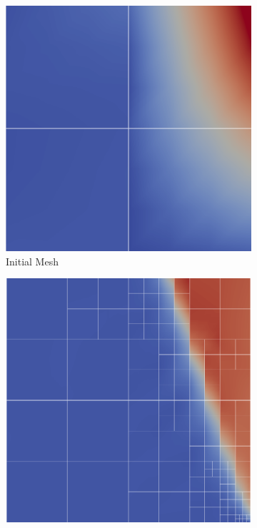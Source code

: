 \documentclass[Dissertation.tex]{subfiles}
\begin{document}
\begin{figure}[ht]
\centering
\begin{subfigure}[t]{0.32\textwidth}
\centering
\includegraphics[width=\textwidth]{Dissertation/Noh/Robust-mesh0.png}
\caption{Initial Mesh}
\end{subfigure}
\begin{subfigure}[t]{0.32\textwidth}
\centering
\includegraphics[width=\textwidth]{Dissertation/Noh/Robust-mesh5.png}

\end{subfigure}
\end{figure}
\end{document}
